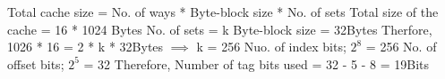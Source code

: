 \documentclass[11pt]{article}
\begin{document}
Total cache size = No. of ways * Byte-block size * No. of sets
Total size of the cache = 16 * 1024 Bytes 
\newline 
No. of sets = k 
\newline 
Byte-block size = 32Bytes 
\newline 
Therfore, 
1026 * 16 = 2 * k * 32Bytes 
\newline 
$\implies$ k = 256
\newline 
Nuo. of index bits; $2^{8}$ = 256
\newline 
No. of offset bits; $2^5 $ = 32
\newline 
Therefore, Number of tag bits used = 32 - 5 - 8 = 19Bits
\end{document}
